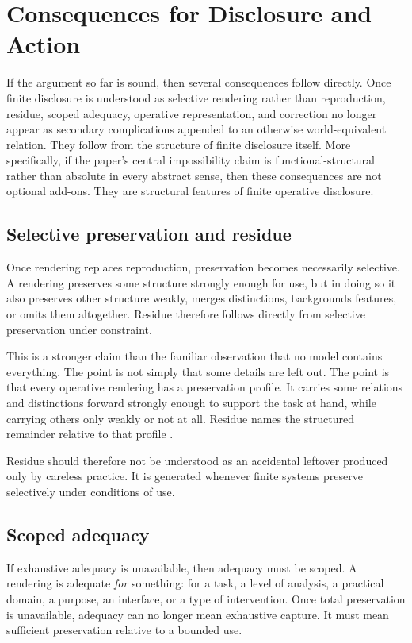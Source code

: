 \documentclass[11pt]{article}
\renewcommand{\emph}[1]{\textit{#1}}
\begin{document}
\section{Consequences for Disclosure and Action}

If the argument so far is sound, then several consequences follow directly. Once finite disclosure is understood as selective rendering rather than reproduction, residue, scoped adequacy, operative representation, and correction no longer appear as secondary complications appended to an otherwise world-equivalent relation. They follow from the structure of finite disclosure itself. More specifically, if the paper's central impossibility claim is functional-structural rather than absolute in every abstract sense, then these consequences are not optional add-ons. They are structural features of finite operative disclosure.

\subsection{Selective preservation and residue}

Once rendering replaces reproduction, preservation becomes necessarily selective. A rendering preserves some structure strongly enough for use, but in doing so it also preserves other structure weakly, merges distinctions, backgrounds features, or omits them altogether. Residue therefore follows directly from selective preservation under constraint.

This is a stronger claim than the familiar observation that no model contains everything. The point is not simply that some details are left out. The point is that every operative rendering has a preservation profile. It carries some relations and distinctions forward strongly enough to support the task at hand, while carrying others only weakly or not at all. Residue names the structured remainder relative to that profile \cite{BowkerStar1999SortingThingsOut}.

Residue should therefore not be understood as an accidental leftover produced only by careless practice. It is generated whenever finite systems preserve selectively under conditions of use.

\subsection{Scoped adequacy}

If exhaustive adequacy is unavailable, then adequacy must be scoped. A rendering is adequate \emph{for} something: for a task, a level of analysis, a practical domain, a purpose, an interface, or a type of intervention. Once total preservation is unavailable, adequacy can no longer mean exhaustive capture. It must mean sufficient preservation relative to a bounded use.
\end{document}
